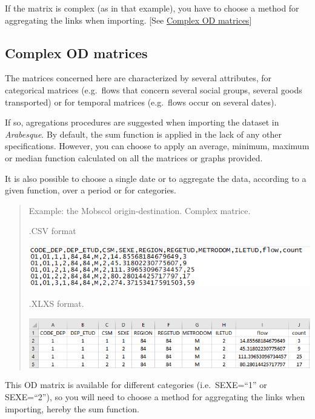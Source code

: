 \documentclass[
  letterpaper,
  DIV=11,
  numbers=noendperiod]{scrreprt}
\begin{document}
If the matrix is complex (as in that example), you have to choose a
method for aggregating the links when importing. {[}See
\hyperref[complex-od-matrices]{Complex OD matrices}{]}

\subsection{Complex OD matrices}\label{complex-od-matrices}

The matrices concerned here are characterized by several attributes, for
categorical matrices (e.g.~flows that concern several social groups,
several goods transported) or for temporal matrices (e.g.~flows occur on
several dates).

If so, agregations procedures are suggested when importing the dataset
in \emph{Arabesque}. By default, the sum function is applied in the lack
of any other specifications. However, you can choose to apply an
average, minimum, maximum or median function calculated on all the
matrices or graphs provided.

It is also possible to choose a single date or to aggregate the data,
according to a given function, over a period or for categories.

\begin{quote}
Example: the Mobscol origin-destination. Complex matrice.

.CSV format

\includegraphics{images/Example_mobscol_OD_CSV.PNG}

.XLXS format.

\begin{center}
\includegraphics{images/Example_mobscol_OD.PNG}
\end{center}
\end{quote}

This OD matrix is available for different categories (i.e.~SEXE=``1'' or
SEXE=``2''), so you will need to choose a method for aggregating the
links when importing, hereby the sum function.
\end{document}
